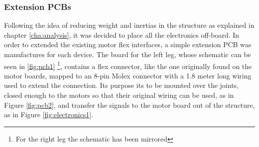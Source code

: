 
\subsubsection{Extension PCBs} %
\label{ssub:extension_pcbs}
Following the idea of reducing weight and inertias in the structure as explained in chapter \ref{cha:analysis}, it was decided to place all the electronics off-board.
In order to extended the existing motor flex interfaces, a simple extension PCB was manufactures for each device.
The board for the left leg, whose schematic can be seen in \ref{fig:pcb1} \footnote{For the right leg the schematic has been mirrored}, contains a flex connector, like the one originally found on the motor boards, mapped to an 8-pin Molex connector with a 1.8 meter long wiring used to extend the connection.
Its purpose its to be mounted over the joints, closed enough to the motors so that their original wiring can be used, as in Figure \ref{fig:pcb2}, and transfer the signals to the motor board out of the structure, as in Figure \ref{fig:electronics1}.

